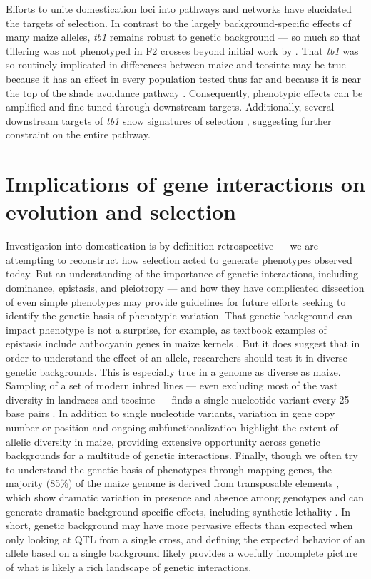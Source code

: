 \documentclass[9pt,twocolumn,twoside]{rilabRxiv}
\begin{document}
Efforts to unite domestication loci into pathways and networks have elucidated the targets of selection.
In contrast to the largely background-specific effects of many maize alleles, \textit{tb1} remains robust to genetic background --- so much so that tillering was not phenotyped in F2 crosses beyond initial work by \citet{doebley1991}.
That  \textit{tb1} was so routinely implicated in differences between maize and teosinte may be true because it has an effect in every population tested thus far and because it is near the top of the shade avoidance pathway \citep{studer2017}.
Consequently, phenotypic effects can be amplified and fine-tuned through downstream targets.
Additionally, several downstream targets of \textit{tb1} show signatures of selection \citep{studer2017}, suggesting further constraint on the entire pathway.

\section*{Implications of gene interactions on evolution and selection}

Investigation into domestication is by definition retrospective --- we are attempting to reconstruct how selection acted to generate phenotypes observed today.
But an understanding of the importance of genetic interactions, including dominance, epistasis, and pleiotropy --- and how they have complicated dissection of even simple phenotypes may provide guidelines for future efforts seeking to identify the genetic basis of phenotypic variation.
That genetic background can impact phenotype is not a surprise, for example, as textbook examples of epistasis include anthocyanin genes in maize kernels \citep{coe1988}.
But it does suggest that in order to understand the effect of an allele, researchers should test it in diverse genetic backgrounds.
This is especially true in a genome as diverse as maize.
Sampling of a set of modern inbred lines --- even excluding most of the vast diversity in landraces and teosinte --- finds a single nucleotide variant every 25 base pairs \citep{bukowski2015}.
In addition to single nucleotide variants, variation in gene copy number \citep{swanson2010} or position \citep{liu2012} and ongoing
 subfunctionalization \citep{pophaly2015} highlight the extent of allelic diversity in maize, providing extensive opportunity across genetic backgrounds for a multitude of  genetic interactions.
Finally, though we often try to understand the genetic basis of phenotypes through mapping genes, the majority (85\%) of the maize genome is derived from transposable elements \citep{schnable2009}, which show dramatic variation in presence and absence among genotypes \citep{wang2006} and can generate  dramatic background-specific effects, including synthetic lethality \citep{gutierreznava1998}.
In short, genetic background may have more pervasive effects than expected when only looking at QTL from a single cross, and defining the expected behavior of an allele based on a single background likely provides a woefully incomplete picture of what is likely a rich landscape of genetic interactions.
\end{document}

